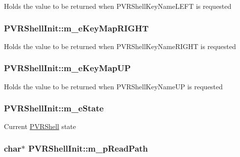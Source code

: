 Holds the value to be returned when P\+V\+R\+Shell\+Key\+Name\+L\+E\+F\+T is requested \hypertarget{class_p_v_r_shell_init_a22f524c93c0bfbf5ae7f5d90be3b1290}{
\subsubsection[{m\+\_\+e\+Key\+Map\+R\+I\+G\+H\+T}]{ P\+V\+R\+Shell\+Init\+::m\+\_\+e\+Key\+Map\+R\+I\+G\+H\+T}}\label{class_p_v_r_shell_init_a22f524c93c0bfbf5ae7f5d90be3b1290}
Holds the value to be returned when P\+V\+R\+Shell\+Key\+Name\+R\+I\+G\+H\+T is requested \hypertarget{class_p_v_r_shell_init_a9b2bde4498986ac674329b3b7aba6e53}{
\subsubsection[{m\+\_\+e\+Key\+Map\+U\+P}]{ P\+V\+R\+Shell\+Init\+::m\+\_\+e\+Key\+Map\+U\+P}}\label{class_p_v_r_shell_init_a9b2bde4498986ac674329b3b7aba6e53}
Holds the value to be returned when P\+V\+R\+Shell\+Key\+Name\+U\+P is requested \hypertarget{class_p_v_r_shell_init_a90d20c5da07f3dd2cae158c36e9acd48}{
\subsubsection[{m\+\_\+e\+State}]{ P\+V\+R\+Shell\+Init\+::m\+\_\+e\+State}}\label{class_p_v_r_shell_init_a90d20c5da07f3dd2cae158c36e9acd48}
Current \hyperlink{class_p_v_r_shell}{P\+V\+R\+Shell} state \hypertarget{class_p_v_r_shell_init_a72008e1300f60528240eb8cd3fb5d626}{
\subsubsection[{m\+\_\+p\+Read\+Path}]{\setlength{\rightskip}{0pt plus 5cm}char$\ast$ P\+V\+R\+Shell\+Init\+::m\+\_\+p\+Read\+Path}}\label{class_p_v_r_shell_init_a72008e1300f60528240eb8cd3fb5d626}

